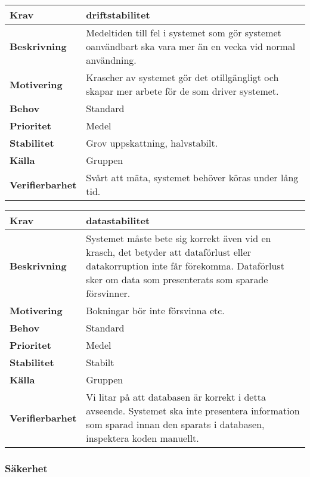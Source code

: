 \documentclass[a4paper, twoside, 11pt, titlepage]{article}
\begin{document}
		\begin{tabular} { | p{3cm} | p{12.2cm} | }
			\hline
			\textbf{Krav} & driftstabilitet  \\
			\hline
			\textbf{Beskrivning} & Medeltiden till fel i systemet som gör systemet oanvändbart ska vara mer än en vecka vid normal användning.  \\
			\hline
			\textbf{Motivering} & Krascher av systemet gör det otillgängligt och skapar mer arbete för de som driver systemet.  \\
			\hline
			\textbf{Behov} & Standard  \\
			\hline
			\textbf{Prioritet} & Medel  \\
			\hline
			\textbf{Stabilitet} & Grov uppskattning, halvstabilt.  \\
			\hline
			\textbf{Källa} & Gruppen  \\
			\hline
			\textbf{Verifierbarhet} & Svårt att mäta, systemet behöver köras under lång tid.  \\
			\hline
		\end{tabular}

		\begin{tabular} { | p{3cm} | p{12.2cm} | }
			\hline
			\textbf{Krav} & datastabilitet  \\
			\hline
			\textbf{Beskrivning} & Systemet måste bete sig korrekt även vid en krasch, det betyder att dataförlust eller datakorruption inte får förekomma. Dataförlust sker om data som presenterats som sparade försvinner.  \\
			\hline
			\textbf{Motivering} & Bokningar bör inte försvinna etc.  \\
			\hline
			\textbf{Behov} & Standard  \\
			\hline
			\textbf{Prioritet} & Medel  \\
			\hline
			\textbf{Stabilitet} & Stabilt  \\
			\hline
			\textbf{Källa} & Gruppen  \\
			\hline
			\textbf{Verifierbarhet} & Vi litar på att databasen är korrekt i detta avseende. Systemet ska inte presentera information som sparad innan den sparats i databasen, inspektera koden manuellt.  \\
			\hline
		\end{tabular}


	\subsubsection{Säkerhet}
\end{document}
